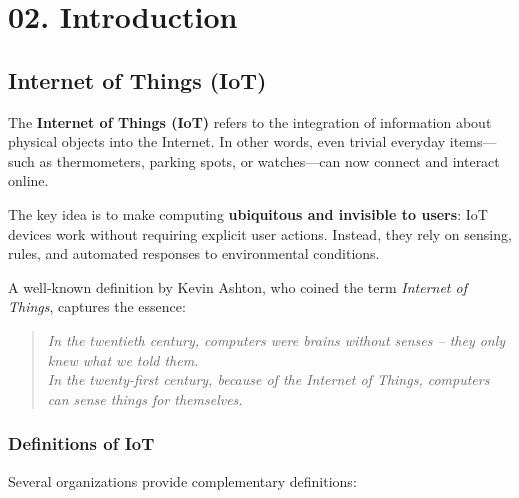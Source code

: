 \chapter{02. Introduction}
\section{Internet of Things (IoT)}

The \textbf{Internet of Things (IoT)} refers to the integration of information about physical objects into the Internet. In other words, even trivial everyday items---such as thermometers, parking spots, or watches---can now connect and interact online.

The key idea is to make computing \textbf{ubiquitous and invisible to users}: IoT devices work without requiring explicit user actions. Instead, they rely on sensing, rules, and automated responses to environmental conditions.

A well-known definition by Kevin Ashton, who coined the term \textit{Internet of Things}, captures the essence:

\begin{quote}
\textit{In the twentieth century, computers were brains without senses -- they only knew what we told them.\\
In the twenty-first century, because of the Internet of Things, computers can sense things for themselves.}
\end{quote}

\subsection{Definitions of IoT}

Several organizations provide complementary definitions:

